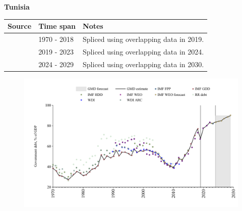 \documentclass[12pt,a4paper,landscape]{article}
\begin{document}
\begin{adjustbox}{max totalsize={\paperwidth}{\paperheight},center}
\begin{minipage}[t][\textheight][t]{\textwidth}
\vspace*{0.5cm}
{}
\begin{center}
{\Large\bfseries Tunisia}
\end{center}
\vspace{0.5cm}
\begin{table}[H]
\centering
\small
\begin{tabular}{|l|l|l|}
\hline
\textbf{Source} & \textbf{Time span} & \textbf{Notes} \\
\hline
\rowcolor{white}\cite{IMF_GDD}& 1970 - 2018 &Spliced using overlapping data in 2019.\\
\rowcolor{lightgray}\cite{IMF_FPP}& 2019 - 2023 &Spliced using overlapping data in 2024.\\
\rowcolor{white}\cite{IMF_WEO_forecast}& 2024 - 2029 &Spliced using overlapping data in 2030.\\
\hline
\end{tabular}
\end{table}
\begin{figure}[H]
\centering
\includegraphics[width=\textwidth,height=0.6\textheight,keepaspectratio]{graphs/TUN_govdebt_GDP.pdf}
\end{figure}
\end{minipage}
\end{adjustbox}
\end{document}
